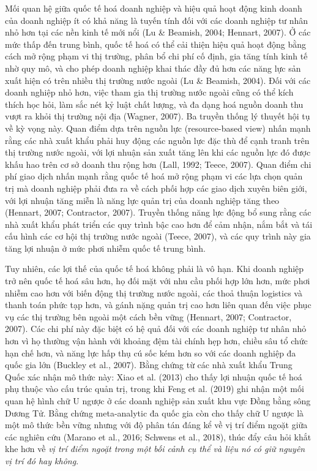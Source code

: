 \documentclass[12pt,a4paper]{article}
\begin{document}
Mối quan hệ giữa quốc tế hoá doanh nghiệp và hiệu quả hoạt động kinh
doanh của doanh nghiệp ít có khả năng là tuyến tính đối với các doanh
nghiệp tư nhân nhỏ hơn tại các nền kinh tế mới nổi (Lu \& Beamish, 2004;
Hennart, 2007). Ở các mức thấp đến trung bình, quốc tế hoá có thể cải
thiện hiệu quả hoạt động bằng cách mở rộng phạm vi thị trường, phân bổ
chi phí cố định, gia tăng tính kinh tế nhờ quy mô, và cho phép doanh
nghiệp khai thác đầy đủ hơn các năng lực sản xuất hiện có trên nhiều thị
trường nước ngoài (Lu \& Beamish, 2004). Đối với các doanh nghiệp nhỏ
hơn, việc tham gia thị trường nước ngoài cũng có thể kích thích học hỏi,
làm sắc nét kỷ luật chất lượng, và đa dạng hoá nguồn doanh thu vượt ra
khỏi thị trường nội địa (Wagner, 2007). Ba truyền thống lý thuyết hội tụ
về kỳ vọng này. Quan điểm dựa trên nguồn lực (resource-based view) nhấn
mạnh rằng các nhà xuất khẩu phải huy động các nguồn lực đặc thù để cạnh
tranh trên thị trường nước ngoài, với lợi nhuận sản xuất tăng lên khi
các nguồn lực đó được khấu hao trên cơ sở doanh thu rộng hơn (Lall,
1992; Teece, 2007). Quan điểm chi phí giao dịch nhấn mạnh rằng quốc tế
hoá mở rộng phạm vi các lựa chọn quản trị mà doanh nghiệp phải đưa ra về
cách phối hợp các giao dịch xuyên biên giới, với lợi nhuận tăng miễn là
năng lực quản trị của doanh nghiệp tăng theo (Hennart, 2007; Contractor,
2007). Truyền thống năng lực động bổ sung rằng các nhà xuất khẩu phát
triển các quy trình bậc cao hơn để cảm nhận, nắm bắt và tái cấu hình các
cơ hội thị trường nước ngoài (Teece, 2007), và các quy trình này gia
tăng lợi nhuận ở mức phơi nhiễm quốc tế trung bình.

Tuy nhiên, các lợi thế của quốc tế hoá không phải là vô hạn. Khi doanh
nghiệp trở nên quốc tế hoá sâu hơn, họ đối mặt với nhu cầu phối hợp lớn
hơn, mức phơi nhiễm cao hơn với biến động thị trường nước ngoài, các
thoả thuận logistics và thanh toán phức tạp hơn, và gánh nặng quản trị
cao hơn liên quan đến việc phục vụ các thị trường bên ngoài một cách bền
vững (Hennart, 2007; Contractor, 2007). Các chi phí này đặc biệt có hệ
quả đối với các doanh nghiệp tư nhân nhỏ hơn vì họ thường vận hành với
khoảng đệm tài chính hẹp hơn, chiều sâu tổ chức hạn chế hơn, và năng lực
hấp thụ cú sốc kém hơn so với các doanh nghiệp đa quốc gia lớn (Buckley
et al., 2007). Bằng chứng từ các nhà xuất khẩu Trung Quốc xác nhận mô
thức này: Xiao et al. (2013) cho thấy lợi nhuận quốc tế hoá phụ thuộc
vào cấu trúc quản trị, trong khi Feng et al. (2019) ghi nhận một mối
quan hệ hình chữ U ngược ở các doanh nghiệp sản xuất khu vực Đồng bằng
sông Dương Tử. Bằng chứng meta-analytic đa quốc gia còn cho thấy chữ U
ngược là một mô thức bền vững nhưng với độ phân tán đáng kể về vị trí
điểm ngoặt giữa các nghiên cứu (Marano et al., 2016; Schwens et al.,
2018), thúc đẩy câu hỏi khắt khe hơn về \emph{vị trí điểm ngoặt trong
một bối cảnh cụ thể và liệu nó có giữ nguyên vị trí đó hay không}.
\end{document}
